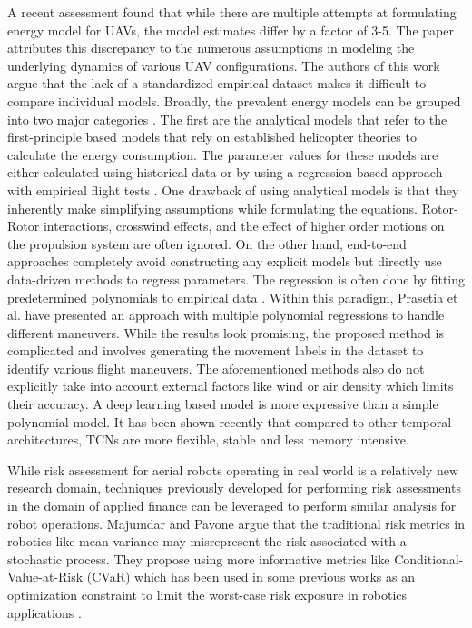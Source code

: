 \documentclass[letterpaper, 10 pt, conference]{ieeeconf}
\begin{document}
A recent assessment \cite{zhang2020energy} found that while there are multiple attempts at formulating energy model for UAVs, the model estimates differ by a factor of 3-5. The paper attributes this discrepancy to the numerous assumptions in modeling the underlying dynamics of various UAV configurations. The authors of this work argue that the lack of a standardized empirical dataset makes it difficult to compare individual models. Broadly, the prevalent energy models can be grouped into two major categories \cite{prasetia2019mission}. The first are the analytical models that refer to the first-principle based models that rely on established helicopter theories to calculate the energy consumption.
The parameter values for these models are either calculated using historical data \cite{kirschstein2020comparison} or by using a regression-based approach with empirical flight tests \cite{liu2017power}. 
One drawback of using analytical models is that they inherently make simplifying assumptions while formulating the equations. Rotor-Rotor interactions, crosswind effects, and the effect of higher order motions on the propulsion system are often ignored. 
On the other hand, end-to-end approaches completely avoid constructing any explicit models but directly use data-driven methods to regress parameters. The regression is often done by fitting predetermined polynomials to empirical data \cite{abeywickrama2018empirical,maekawa2017power}. Within this paradigm, Prasetia et al. \cite{prasetia2019mission} have presented an approach with multiple polynomial regressions to handle different maneuvers. While the results look promising, the proposed method is complicated and involves generating the movement labels in the dataset to identify various flight maneuvers. The aforementioned methods also do not explicitly take into account external factors like wind or air density which limits their accuracy. A deep learning based model is more expressive than a simple polynomial model. It has been shown recently \cite{bai2018empirical} that compared to other temporal architectures, TCNs are more flexible, stable and less memory intensive.


\par While risk assessment for aerial robots operating in real world is a relatively new research domain, techniques previously developed for performing risk assessments in the domain of applied finance \cite{shapiro2014lectures, rockafellar2000optimization} can be leveraged to perform similar analysis for robot operations. Majumdar and Pavone \cite{majumdar2020should} argue that the traditional risk metrics in robotics like mean-variance may misrepresent the risk associated with a stochastic process. They propose using more informative metrics like Conditional-Value-at-Risk (CVaR) which has been used in some previous works as an optimization constraint to limit the worst-case risk exposure in robotics applications \cite{hakobyan2019risk,sharma2020risk}. 
\end{document}
